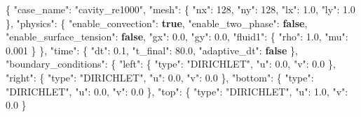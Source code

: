 \documentclass[
  french,
]{article}
\newenvironment{Shaded}{}{}
\newcommand{\DataTypeTok}[1]{\textcolor[rgb]{0.56,0.13,0.00}{#1}}
\newcommand{\DecValTok}[1]{\textcolor[rgb]{0.25,0.63,0.44}{#1}}
\newcommand{\FloatTok}[1]{\textcolor[rgb]{0.25,0.63,0.44}{#1}}
\newcommand{\FunctionTok}[1]{\textcolor[rgb]{0.02,0.16,0.49}{#1}}
\newcommand{\KeywordTok}[1]{\textcolor[rgb]{0.00,0.44,0.13}{\textbf{#1}}}
\newcommand{\StringTok}[1]{\textcolor[rgb]{0.25,0.44,0.63}{#1}}
\begin{document}
\begin{Shaded}
\begin{Highlighting}[]
\FunctionTok{\{}
  \DataTypeTok{"case\_name"}\FunctionTok{:} \StringTok{"cavity\_re1000"}\FunctionTok{,}
  \DataTypeTok{"mesh"}\FunctionTok{:} \FunctionTok{\{} \DataTypeTok{"nx"}\FunctionTok{:} \DecValTok{128}\FunctionTok{,} \DataTypeTok{"ny"}\FunctionTok{:} \DecValTok{128}\FunctionTok{,} \DataTypeTok{"lx"}\FunctionTok{:} \FloatTok{1.0}\FunctionTok{,} \DataTypeTok{"ly"}\FunctionTok{:} \FloatTok{1.0} \FunctionTok{\},}
  \DataTypeTok{"physics"}\FunctionTok{:} \FunctionTok{\{}
    \DataTypeTok{"enable\_convection"}\FunctionTok{:} \KeywordTok{true}\FunctionTok{,}
    \DataTypeTok{"enable\_two\_phase"}\FunctionTok{:} \KeywordTok{false}\FunctionTok{,}
    \DataTypeTok{"enable\_surface\_tension"}\FunctionTok{:} \KeywordTok{false}\FunctionTok{,}
    \DataTypeTok{"gx"}\FunctionTok{:} \FloatTok{0.0}\FunctionTok{,} \DataTypeTok{"gy"}\FunctionTok{:} \FloatTok{0.0}\FunctionTok{,}
    \DataTypeTok{"fluid1"}\FunctionTok{:} \FunctionTok{\{} \DataTypeTok{"rho"}\FunctionTok{:} \FloatTok{1.0}\FunctionTok{,} \DataTypeTok{"mu"}\FunctionTok{:} \FloatTok{0.001} \FunctionTok{\}}
  \FunctionTok{\},}
  \DataTypeTok{"time"}\FunctionTok{:} \FunctionTok{\{} \DataTypeTok{"dt"}\FunctionTok{:} \FloatTok{0.1}\FunctionTok{,} \DataTypeTok{"t\_final"}\FunctionTok{:} \FloatTok{80.0}\FunctionTok{,} \DataTypeTok{"adaptive\_dt"}\FunctionTok{:} \KeywordTok{false} \FunctionTok{\},}
  \DataTypeTok{"boundary\_conditions"}\FunctionTok{:} \FunctionTok{\{}
    \DataTypeTok{"left"}\FunctionTok{:}   \FunctionTok{\{} \DataTypeTok{"type"}\FunctionTok{:} \StringTok{"DIRICHLET"}\FunctionTok{,} \DataTypeTok{"u"}\FunctionTok{:} \FloatTok{0.0}\FunctionTok{,} \DataTypeTok{"v"}\FunctionTok{:} \FloatTok{0.0} \FunctionTok{\},}
    \DataTypeTok{"right"}\FunctionTok{:}  \FunctionTok{\{} \DataTypeTok{"type"}\FunctionTok{:} \StringTok{"DIRICHLET"}\FunctionTok{,} \DataTypeTok{"u"}\FunctionTok{:} \FloatTok{0.0}\FunctionTok{,} \DataTypeTok{"v"}\FunctionTok{:} \FloatTok{0.0} \FunctionTok{\},}
    \DataTypeTok{"bottom"}\FunctionTok{:} \FunctionTok{\{} \DataTypeTok{"type"}\FunctionTok{:} \StringTok{"DIRICHLET"}\FunctionTok{,} \DataTypeTok{"u"}\FunctionTok{:} \FloatTok{0.0}\FunctionTok{,} \DataTypeTok{"v"}\FunctionTok{:} \FloatTok{0.0} \FunctionTok{\},}
    \DataTypeTok{"top"}\FunctionTok{:}    \FunctionTok{\{} \DataTypeTok{"type"}\FunctionTok{:} \StringTok{"DIRICHLET"}\FunctionTok{,} \DataTypeTok{"u"}\FunctionTok{:} \FloatTok{1.0}\FunctionTok{,} \DataTypeTok{"v"}\FunctionTok{:} \FloatTok{0.0} \FunctionTok{\}}

\end{Highlighting}
\end{Shaded}
\end{document}
